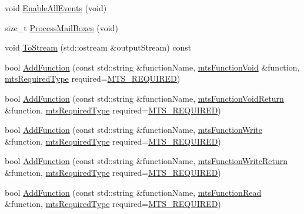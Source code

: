 \begin{DoxyCompactItemize}
void \hyperlink{classmts_interface_required_a0db28333d5d0b79355ef53144a09b593}{Enable\+All\+Events} (void)
\item 
size\+\_\+t \hyperlink{classmts_interface_required_a3e769b22bfd482d10017ce470263f2a1}{Process\+Mail\+Boxes} (void)
\item 
void \hyperlink{classmts_interface_required_ad53b7950640adb692b779c1bb36aba8b}{To\+Stream} (std\+::ostream \&output\+Stream) const 
\item 
bool \hyperlink{classmts_interface_required_ad2ab83c04348062513a7e3033df82d61}{Add\+Function} (const std\+::string \&function\+Name, \hyperlink{classmts_function_void}{mts\+Function\+Void} \&function, \hyperlink{mts_forward_declarations_8h_a9ef1ce54724afde7802db326ff8606f3}{mts\+Required\+Type} required=\hyperlink{mts_forward_declarations_8h_a9ef1ce54724afde7802db326ff8606f3ae01fd85391b60e546bbb1be9716c4ec9}{M\+T\+S\+\_\+\+R\+E\+Q\+U\+I\+R\+E\+D})
\item 
bool \hyperlink{classmts_interface_required_acbe83b9581fdb7566a353881b88ab1ef}{Add\+Function} (const std\+::string \&function\+Name, \hyperlink{classmts_function_void_return}{mts\+Function\+Void\+Return} \&function, \hyperlink{mts_forward_declarations_8h_a9ef1ce54724afde7802db326ff8606f3}{mts\+Required\+Type} required=\hyperlink{mts_forward_declarations_8h_a9ef1ce54724afde7802db326ff8606f3ae01fd85391b60e546bbb1be9716c4ec9}{M\+T\+S\+\_\+\+R\+E\+Q\+U\+I\+R\+E\+D})
\item 
bool \hyperlink{classmts_interface_required_a87661cef474a4ae5b4d27510b363f87a}{Add\+Function} (const std\+::string \&function\+Name, \hyperlink{classmts_function_write}{mts\+Function\+Write} \&function, \hyperlink{mts_forward_declarations_8h_a9ef1ce54724afde7802db326ff8606f3}{mts\+Required\+Type} required=\hyperlink{mts_forward_declarations_8h_a9ef1ce54724afde7802db326ff8606f3ae01fd85391b60e546bbb1be9716c4ec9}{M\+T\+S\+\_\+\+R\+E\+Q\+U\+I\+R\+E\+D})
\item 
bool \hyperlink{classmts_interface_required_ae673de7b335bc64c9396fb35b99d1d04}{Add\+Function} (const std\+::string \&function\+Name, \hyperlink{classmts_function_write_return}{mts\+Function\+Write\+Return} \&function, \hyperlink{mts_forward_declarations_8h_a9ef1ce54724afde7802db326ff8606f3}{mts\+Required\+Type} required=\hyperlink{mts_forward_declarations_8h_a9ef1ce54724afde7802db326ff8606f3ae01fd85391b60e546bbb1be9716c4ec9}{M\+T\+S\+\_\+\+R\+E\+Q\+U\+I\+R\+E\+D})
\item 
bool \hyperlink{classmts_interface_required_a13b7efe37262dc270e9937e5da3d7ec0}{Add\+Function} (const std\+::string \&function\+Name, \hyperlink{classmts_function_read}{mts\+Function\+Read} \&function, \hyperlink{mts_forward_declarations_8h_a9ef1ce54724afde7802db326ff8606f3}{mts\+Required\+Type} required=\hyperlink{mts_forward_declarations_8h_a9ef1ce54724afde7802db326ff8606f3ae01fd85391b60e546bbb1be9716c4ec9}{M\+T\+S\+\_\+\+R\+E\+Q\+U\+I\+R\+E\+D})

\end{DoxyCompactItemize}
